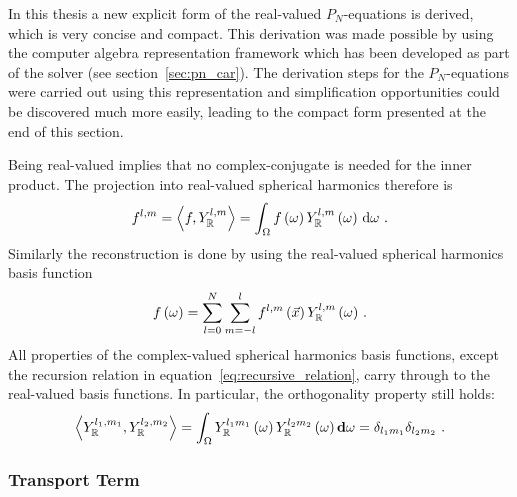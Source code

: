 In this thesis a new explicit form of the real-valued $P_N$-equations is derived, which is very concise and compact. This derivation was made possible by using the computer algebra representation framework which has been developed as part of the solver (see section~\ref{sec:pn_car}). The derivation steps for the $P_N$-equations were carried out using this representation and simplification opportunities could be discovered much more easily, leading to the compact form presented at the end of this section.

Being real-valued implies that no complex-conjugate is needed for the inner product. The projection into real-valued spherical harmonics therefore is
\begin{align}
\label{eq:sh_projection}
f^{l, m} = \left<f,Y_{\mathbb{R}}^{l, m}\right> = 
\int_\Omega f\left(\omega\right)Y_{\mathbb{R}}^{l,m}\left(\omega\right)\,\mathrm{d}\omega
\ .
\end{align}
Similarly the reconstruction is done by using the real-valued spherical harmonics basis function
\begin{align}
f\left(\omega\right) = 
\sum_{l=0}^{N}
{
\sum_{m=-l}^{l}
{
f^{l,m}\left(\vec{x}\right)Y_{\mathbb{R}}^{l,m}\left(\omega\right)
}
}
\ .
\label{eq:sh_real_reconstruction}
\end{align}
All properties of the complex-valued spherical harmonics basis functions, except the recursion relation in equation~\ref{eq:recursive_relation}, carry through to the real-valued basis functions. In particular, the orthogonality property still holds:
\begin{align}
\label{eq:sh_orthogonality_real}
\left<Y_{\mathbb{R}}^{l_1, m_1},Y_{\mathbb{R}}^{l_2, m_2}\right>=
\int_{\Omega} Y_{\mathbb{R}}^{l_1m_1}\left(\omega\right) Y_{\mathbb{R}}^{l_2m_2}\left(\omega\right) \mathbf{d}\omega = \delta_{l_1m_1}\delta_{l_2m_2}
\ .
\end{align}

\subsubsection*{Transport Term}


